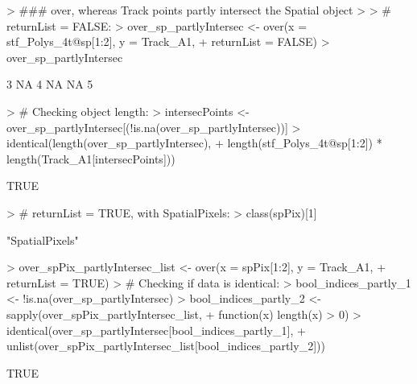 \documentclass[12pt, oneside, a4paper]{scrbook}
\begin{document}
\begin{small}
\begin{Schunk}
\begin{Sinput}
> ### over, whereas Track points partly intersect the Spatial object
> 
> # returnList = FALSE:
> over_sp_partlyIntersec <- over(x = stf_Polys_4t@sp[1:2], y = Track_A1, 
+                                returnList = FALSE)
> over_sp_partlyIntersec
\end{Sinput}
\begin{Soutput}
[1]  3 NA  4 NA NA  5
\end{Soutput}
\begin{Sinput}
> # Checking object length:
> intersecPoints <- over_sp_partlyIntersec[(!is.na(over_sp_partlyIntersec))]
> identical(length(over_sp_partlyIntersec), 
+           length(stf_Polys_4t@sp[1:2]) * length(Track_A1[intersecPoints]))
\end{Sinput}
\begin{Soutput}
[1] TRUE
\end{Soutput}
\begin{Sinput}
> # returnList = TRUE, with SpatialPixels:
> class(spPix)[1]
\end{Sinput}
\begin{Soutput}
[1] "SpatialPixels"
\end{Soutput}
\begin{Sinput}
> over_spPix_partlyIntersec_list <- over(x = spPix[1:2], y = Track_A1, 
+                                        returnList = TRUE)
> # Checking if data is identical:
> bool_indices_partly_1 <- !is.na(over_sp_partlyIntersec)
> bool_indices_partly_2 <- sapply(over_spPix_partlyIntersec_list, 
+                          function(x) length(x) > 0)
> identical(over_sp_partlyIntersec[bool_indices_partly_1], 
+           unlist(over_spPix_partlyIntersec_list[bool_indices_partly_2]))
\end{Sinput}
\begin{Soutput}
[1] TRUE
\end{Soutput}
\end{Schunk}
\end{small}
\end{document}
